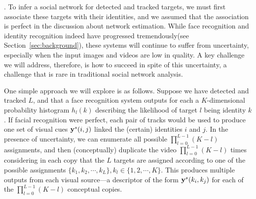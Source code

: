 


. To infer a social network for detected and tracked targets, we must first associate these targets with their identities, and we assumed that the association is perfect in the discussion about network estimation. While face recognition and identity recognition indeed have progressed tremendously(see Section~\ref{sec:background}), these systems will continue to suffer from uncertainty, especially when the input images and videos are low in quality. A key challenge we will address, therefore, is how to succeed in spite of this uncertainty, a challenge that is rare in traditional social network analysis. 


One simple approach we will explore is as follows. Suppose we have detected and tracked $L$, and that a face recognition system outputs for each a $K$-dimensional probability histogram $h_l(k)$ describing the likelihood of target $l$ being identity $k$. If facial recognition were perfect, each pair of  tracks would be used to produce one set of visual cues ${\bf y}^s(i,j)$ linked the (certain) identities $i$ and $j$. In the presence of uncertainty, we can enumerate all possible $\prod_{l=0}^{L-1}(K-l)$  assignments, and then (conceptually) duplicate the video $\prod_{l=0}^{L-1}(K-l)$ times considering in each copy that the $L$ targets are assigned according to one of the possible assignments $\{k_1, k_2, \cdots, k_L\}, k_l\in\{1,2, \cdots, K\}$. This produces multiple outputs from each visual source---a descriptor of the form ${\bf y}^s(k_i,k_j)$ for each of the $\prod_{l=0}^{L-1}(K-l)$ conceptual copies. 

